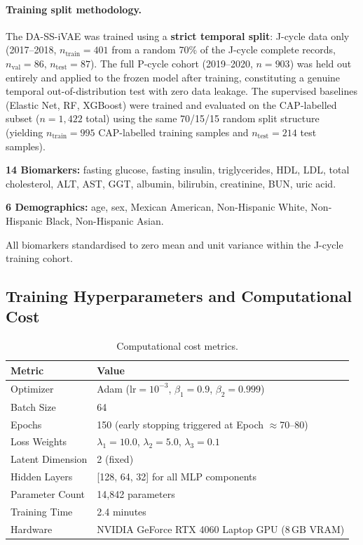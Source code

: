 \documentclass[12pt,a4paper,oneside]{report}
\begin{document}
\paragraph{Training split methodology.}
The DA-SS-iVAE was trained using a \textbf{strict temporal split}: J-cycle data only (2017--2018, $n_{\text{train}} = 401$ from a random 70\% of the J-cycle complete records, $n_{\text{val}} = 86$, $n_{\text{test}} = 87$). The full P-cycle cohort (2019--2020, $n = 903$) was held out entirely and applied to the frozen model after training, constituting a genuine temporal out-of-distribution test with zero data leakage. The supervised baselines (Elastic Net, RF, XGBoost) were trained and evaluated on the CAP-labelled subset ($n = 1{,}422$ total) using the same 70/15/15 random split structure (yielding $n_{\text{train}} = 995$ CAP-labelled training samples and $n_{\text{test}} = 214$ test samples).

\noindent\textbf{14 Biomarkers:} fasting glucose, fasting insulin, triglycerides, HDL, LDL, total cholesterol, ALT, AST, GGT, albumin, bilirubin, creatinine, BUN, uric acid.

\noindent\textbf{6 Demographics:} age, sex, Mexican American, Non-Hispanic White, Non-Hispanic Black, Non-Hispanic Asian.

All biomarkers standardised to zero mean and unit variance within the J-cycle training cohort.

\subsection{Training Hyperparameters and Computational Cost}

\begin{table}[H]
\centering
\caption{Computational cost metrics.}
\label{tab:compute}
\begin{tabular}{@{}ll@{}}
\toprule
\textbf{Metric} & \textbf{Value} \\ \midrule
Optimizer          & Adam ($\text{lr} = 10^{-3}$, $\beta_1 = 0.9$, $\beta_2 = 0.999$) \\
Batch Size         & 64 \\
Epochs             & 150 (early stopping triggered at Epoch $\approx$70--80) \\
Loss Weights       & $\lambda_1 = 10.0$, $\lambda_2 = 5.0$, $\lambda_3 = 0.1$ \\
Latent Dimension   & 2 (fixed) \\
Hidden Layers      & [128, 64, 32] for all MLP components \\
Parameter Count    & 14,842 parameters \\
Training Time      & 2.4 minutes \\
Hardware           & NVIDIA GeForce RTX 4060 Laptop GPU (8\,GB VRAM) \\ \bottomrule
\end{tabular}
\end{table}
\end{document}
